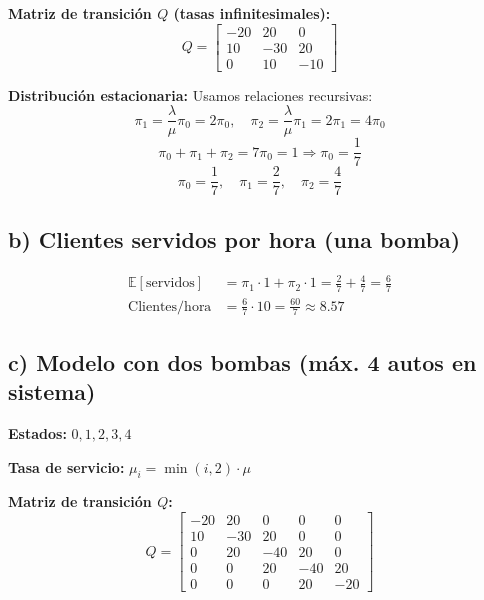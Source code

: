 \documentclass[10pt]{article}
\begin{document}
\textbf{Matriz de transición $Q$ (tasas infinitesimales):}
\begin{equation*}
Q =
\begin{bmatrix}
-20 & 20 & 0 \\
10 & -30 & 20 \\
0 & 10 & -10
\end{bmatrix}
\end{equation*}

\textbf{Distribución estacionaria:} Usamos relaciones recursivas:
\begin{equation*}
\pi_1 = \frac{\lambda}{\mu} \pi_0 = 2\pi_0, \quad \pi_2 = \frac{\lambda}{\mu} \pi_1 = 2\pi_1 = 4\pi_0
\end{equation*}
\begin{equation*}
\pi_0 + \pi_1 + \pi_2 = 7\pi_0 = 1 \Rightarrow \pi_0 = \frac{1}{7}
\end{equation*}
\begin{equation*}
\boxed{\pi_0 = \frac{1}{7}, \quad \pi_1 = \frac{2}{7}, \quad \pi_2 = \frac{4}{7}}
\end{equation*}

\subsection*{b) Clientes servidos por hora (una bomba)}

\begin{align*}
\mathbb{E}[\text{servidos}] &= \pi_1 \cdot 1 + \pi_2 \cdot 1 = \frac{2}{7} + \frac{4}{7} = \frac{6}{7} \\
\text{Clientes/hora} &= \frac{6}{7} \cdot 10 = \boxed{\frac{60}{7} \approx 8.57}
\end{align*}

\subsection*{c) Modelo con dos bombas (máx. 4 autos en sistema)}

\textbf{Estados:} $0, 1, 2, 3, 4$

\textbf{Tasa de servicio:} $\mu_i = \min(i, 2) \cdot \mu$

\textbf{Matriz de transición $Q$:}
\begin{equation*}
Q =
\begin{bmatrix}
-20 & 20 & 0 & 0 & 0 \\
10 & -30 & 20 & 0 & 0 \\
0 & 20 & -40 & 20 & 0 \\
0 & 0 & 20 & -40 & 20 \\
0 & 0 & 0 & 20 & -20
\end{bmatrix}
\end{equation*}
\end{document}
